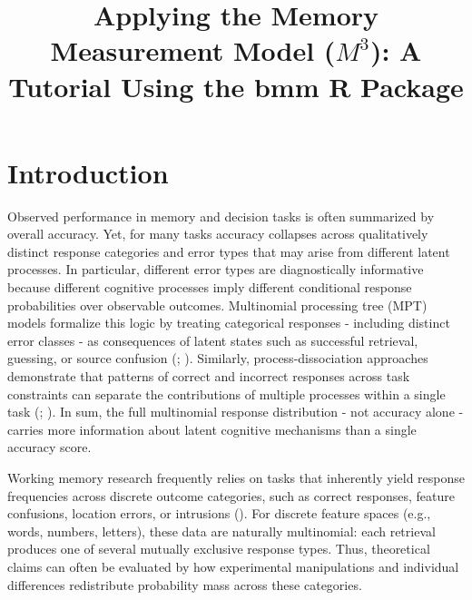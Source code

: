 \documentclass[
  man,
  floatsintext,
  longtable,
  nolmodern,
  notxfonts,
  notimes,
  colorlinks=true,linkcolor=blue,citecolor=blue,urlcolor=blue]{apa7}
\title{Applying the Memory Measurement Model (\(M^3\)): A Tutorial Using
the bmm R Package}
\begin{document}
\maketitle




\setlength\LTleft{0pt}




\section{Introduction}\label{introduction}

Observed performance in memory and decision tasks is often summarized by
overall accuracy. Yet, for many tasks accuracy collapses across
qualitatively distinct response categories and error types that may
arise from different latent processes. In particular, different error
types are diagnostically informative because different cognitive
processes imply different conditional response probabilities over
observable outcomes. Multinomial processing tree (MPT) models formalize
this logic by treating categorical responses - including distinct error
classes - as consequences of latent states such as successful retrieval,
guessing, or source confusion
(;
).
Similarly, process-dissociation approaches demonstrate that patterns of
correct and incorrect responses across task constraints can separate the
contributions of multiple processes within a single task
(;
). In sum,
the full multinomial response distribution - not accuracy alone -
carries more information about latent cognitive mechanisms than a single
accuracy score.

Working memory research frequently relies on tasks that inherently yield
response frequencies across discrete outcome categories, such as correct
responses, feature confusions, location errors, or intrusions
(). For
discrete feature spaces (e.g., words, numbers, letters), these data are
naturally multinomial: each retrieval produces one of several mutually
exclusive response types. Thus, theoretical claims can often be
evaluated by how experimental manipulations and individual differences
redistribute probability mass across these categories.
\end{document}
